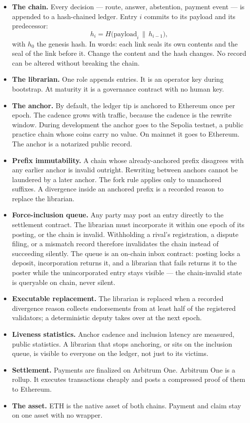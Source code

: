 \documentclass[11pt]{article}
\begin{document}
\begin{itemize}
\item \textbf{The chain.} Every decision --- route, answer,
abstention, payment event --- is appended to a hash-chained
ledger. Entry $i$ commits to its payload and its predecessor:
\begin{equation}
h_i = H\bigl(\mathrm{payload}_i \,\|\, h_{i-1}\bigr),
\end{equation}
with $h_0$ the genesis hash. In words: each link seals its own
contents and the seal of the link before it. Change the content
and the hash changes. No record can be altered without breaking
the chain.
\item \textbf{The librarian.} One role appends entries. It is an
operator key during bootstrap. At maturity it is a governance
contract with no human key.
\item \textbf{The anchor.} By default, the ledger tip is anchored
to Ethereum once per epoch. The cadence grows with traffic,
because the cadence is the rewrite window. During development the
anchor goes to the Sepolia testnet, a public practice chain whose
coins carry no value. On mainnet it goes to Ethereum. The anchor
is a notarized public record.
\item \textbf{Prefix immutability.} A chain whose already-anchored
prefix disagrees with any earlier anchor is invalid outright.
Rewriting between anchors cannot be laundered by a later anchor.
The fork rule applies only to unanchored suffixes. A divergence
inside an anchored prefix is a recorded reason to replace the
librarian.
\item \textbf{Force-inclusion queue.} Any party may post an
entry directly to the settlement contract. The librarian must
incorporate it within one epoch of its posting, or the chain is
invalid. Withholding a rival's registration, a dispute filing, or
a mismatch record therefore invalidates the chain instead of
succeeding silently. The queue is an on-chain inbox contract:
posting locks a deposit, incorporation returns it, and a librarian
that fails returns it to the poster while the unincorporated
entry stays visible --- the chain-invalid state is queryable on
chain, never silent.
\item \textbf{Executable replacement.} The librarian is
replaced when a recorded divergence reason collects endorsements
from at least half of the registered validators; a deterministic
deputy takes over at the next epoch.
\item \textbf{Liveness statistics.} Anchor cadence and
inclusion latency are measured, public statistics. A librarian
that stops anchoring, or sits on the inclusion queue, is visible
to everyone on the ledger, not just to its victims.
\item \textbf{Settlement.} Payments are finalized on Arbitrum One.
Arbitrum One is a rollup. It executes transactions cheaply and
posts a compressed proof of them to Ethereum.
\item \textbf{The asset.} ETH is the native asset of both chains.
Payment and claim stay on one asset with no wrapper.
\end{itemize}
\end{document}
